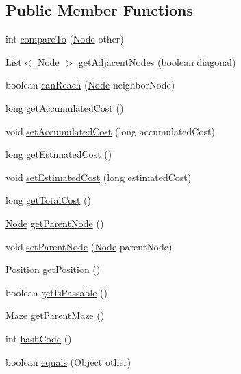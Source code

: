 \subsection*{Public Member Functions}
\begin{DoxyCompactItemize}
\item 
int \hyperlink{classmazelib_1_1data_1_1_node_a6d0332471e8e795262b54c42a7f72cd3}{compare\-To} (\hyperlink{classmazelib_1_1data_1_1_node}{Node} other)
\item 
List$<$ \hyperlink{classmazelib_1_1data_1_1_node}{Node} $>$ \hyperlink{classmazelib_1_1data_1_1_node_a7f1c31cd172078f0d2160639ceae4d6c}{get\-Adjacent\-Nodes} (boolean diagonal)
\item 
boolean \hyperlink{classmazelib_1_1data_1_1_node_abbb9f4db2a23abe1b5ab79aabf632c9c}{can\-Reach} (\hyperlink{classmazelib_1_1data_1_1_node}{Node} neighbor\-Node)
\item 
long \hyperlink{classmazelib_1_1data_1_1_node_a2ad7aa3cd7165ffff7634ebf6e362549}{get\-Accumulated\-Cost} ()
\item 
void \hyperlink{classmazelib_1_1data_1_1_node_a74f88136c6d4c5953db07872b951ae4b}{set\-Accumulated\-Cost} (long accumulated\-Cost)
\item 
long \hyperlink{classmazelib_1_1data_1_1_node_a3e9f05a1e91e8bc6879c2f600e819d7b}{get\-Estimated\-Cost} ()
\item 
void \hyperlink{classmazelib_1_1data_1_1_node_a8405b28d885d50e4bcfa4ef21c5f0942}{set\-Estimated\-Cost} (long estimated\-Cost)
\item 
long \hyperlink{classmazelib_1_1data_1_1_node_a1cc1fcda8a17f24bc72f810c0f76b02e}{get\-Total\-Cost} ()
\item 
\hyperlink{classmazelib_1_1data_1_1_node}{Node} \hyperlink{classmazelib_1_1data_1_1_node_a320a1eae56bbede15573be0499556465}{get\-Parent\-Node} ()
\item 
void \hyperlink{classmazelib_1_1data_1_1_node_a1da6285dea279ef17d514cc8a8f8cbfd}{set\-Parent\-Node} (\hyperlink{classmazelib_1_1data_1_1_node}{Node} parent\-Node)
\item 
\hyperlink{classmazelib_1_1data_1_1_position}{Position} \hyperlink{classmazelib_1_1data_1_1_node_acb069d8e4430f951bebe4c0188e222bc}{get\-Position} ()
\item 
boolean \hyperlink{classmazelib_1_1data_1_1_node_aa54c4931c5ae776275ea2b9128858eec}{get\-Is\-Passable} ()
\item 
\hyperlink{classmazelib_1_1data_1_1_maze}{Maze} \hyperlink{classmazelib_1_1data_1_1_node_aafef828ac17d63ff39d0ae27cf2d761d}{get\-Parent\-Maze} ()
\item 
int \hyperlink{classmazelib_1_1data_1_1_node_a9ff18335087c35e4b6fa7b9796f5f7ef}{hash\-Code} ()
\item 
boolean \hyperlink{classmazelib_1_1data_1_1_node_a5921df3fa5ccb2c3ff328039f7924b93}{equals} (Object other)
\end{DoxyCompactItemize}
